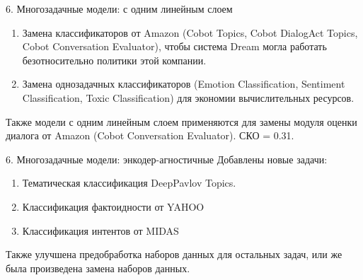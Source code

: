 \begin{frame}{6. Многозадачные модели: с одним линейным слоем}
\begin{enumerate}
\item Замена классификаторов от Amazon (Cobot Topics, Cobot DialogAct Topics, Cobot Conversation Evaluator), чтобы система Dream могла работать безотносительно политики этой компании.
\item Замена однозадачных классификаторов (Emotion Classification, Sentiment Classification, Toxic Classification) для экономии вычислительных ресурсов.
\end{enumerate}
\begin{table}[htbp]
\caption{Точность на различных задачах для разных типов однозадачных моделей, в сравнении с многозадачными. }
\end{table}
\scriptsize Также модели с одним линейным слоем применяются для замены модуля оценки диалога от Amazon (Cobot Conversation Evaluator). СКО = 0.31.

\end{frame}


\begin{frame}{6. Многозадачные модели: энкодер-агностичные}
Добавлены новые задачи: 
\begin{enumerate}
    \item Тематическая классификация DeepPavlov Topics.
    \item Классификация фактоидности от YAHOO
    \item Классификация интентов от MIDAS
\end{enumerate}
 Также улучшена предобработка наборов данных для остальных задач, или же была произведена замена наборов данных.
\end{frame}

